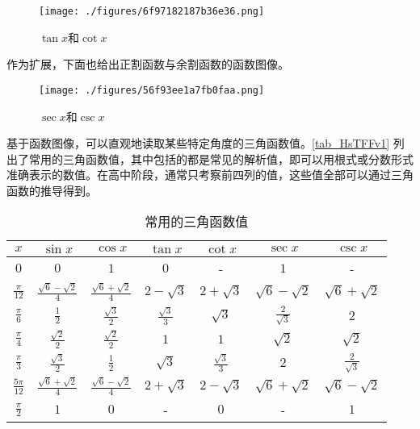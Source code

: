 \begin{figure}[ht]
\centering
\texttt{[image: ./figures/6f97182187b36e36.png]}
\caption{$\tan x$和$\cot x$} \label{fig_HsTFFv_3}
\end{figure}

作为扩展，下面也给出正割函数与余割函数的函数图像。

\begin{figure}[ht]
\centering
\texttt{[image: ./figures/56f93ee1a7fb0faa.png]}
\caption{$\sec x$和$\csc x$} \label{fig_HsTFFv_2}
\end{figure}

基于函数图像，可以直观地读取某些特定角度的三角函数值。\autoref{tab_HsTFFv1} 列出了常用的三角函数值，其中包括的都是常见的解析值，即可以用根式或分数形式准确表示的数值。在高中阶段，通常只考察前四列的值，这些值全部可以通过三角函数的推导得到。

\begin{table}[ht]
\centering
\caption{常用的三角函数值}\label{tab_HsTFFv1}
\begin{tabular}{|c|c|c|c|c|c|c|}
\hline
$x$  & $\sin x$ & $\cos x$ & $\tan x$ & $\cot x$& $\sec x$ & $\csc x$  \\
\hline
$0$ & $0$ & $1$ & $0$ &- & $1$ &-\\
\hline
$\displaystyle\frac{\pi}{12}$ & $\displaystyle\frac{\sqrt{6} - \sqrt{2}}{4}$ & $\displaystyle\frac{\sqrt{6} + \sqrt{2}}{4}$ & $2 - \sqrt{3}$ & $2 + \sqrt{3}$ & $\sqrt{6} - \sqrt{2}$ & $\sqrt{6} + \sqrt{2}$\\
\hline
$\displaystyle\frac{\pi}{6}$ & $\displaystyle\frac{1}{2}$ & $\displaystyle\frac{\sqrt{3}}{2}$ & $\displaystyle\frac{\sqrt{3}}{3}$ & $\sqrt{3}$ & $\displaystyle\frac{2}{\sqrt{3}}$ & $2$ \\
\hline
$\displaystyle\frac{\pi}{4}$ & $\displaystyle\frac{\sqrt{2}}{2}$ & $\displaystyle\frac{\sqrt{2}}{2}$ & $1$ & $1$ & $\sqrt{2}$ & $\sqrt{2}$ \\
\hline
$\displaystyle\frac{\pi}{3}$ & $\displaystyle\frac{\sqrt{3}}{2}$ & $\displaystyle\frac{1}{2}$ & $\sqrt{3}$ & $\displaystyle\frac{\sqrt{3}}{3}$ & $2$ & $\displaystyle\frac{2}{\sqrt{3}}$ \\
\hline
$\displaystyle\frac{5\pi}{12}$ & $\displaystyle\frac{\sqrt{6} + \sqrt{2}}{4}$ & $\displaystyle\frac{\sqrt{6} - \sqrt{2}}{4}$ & $2 + \sqrt{3}$ & $2 - \sqrt{3}$ & $\sqrt{6} + \sqrt{2}$ & $\sqrt{6} - \sqrt{2}$ \\
\hline
$\displaystyle\frac{\pi}{2}$ & $1$ & $0$ &- & $0$ &- & $1$ \\
\hline
\end{tabular}
\end{table}

